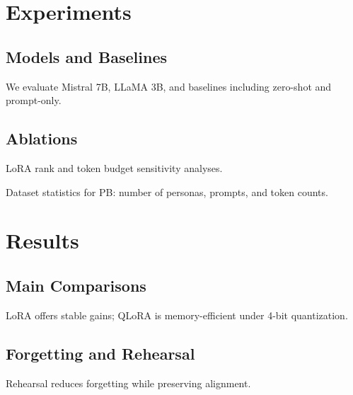 \documentclass[10pt]{article}
\begin{document}
\section{Experiments}
\subsection{Models and Baselines}
We evaluate Mistral 7B, LLaMA 3B, and baselines including zero-shot and prompt-only.

\subsection{Ablations}
LoRA rank and token budget sensitivity analyses.

\begin{table}[t]
	\centering
	\caption{Dataset statistics for PB: number of personas, prompts, and token counts.}
	\label{tab:dataset-pb}
	
\end{table}

\section{Results}
\subsection{Main Comparisons}
LoRA offers stable gains; QLoRA is memory-efficient under 4-bit quantization.

\subsection{Forgetting and Rehearsal}
Rehearsal reduces forgetting while preserving alignment.

\end{document}

